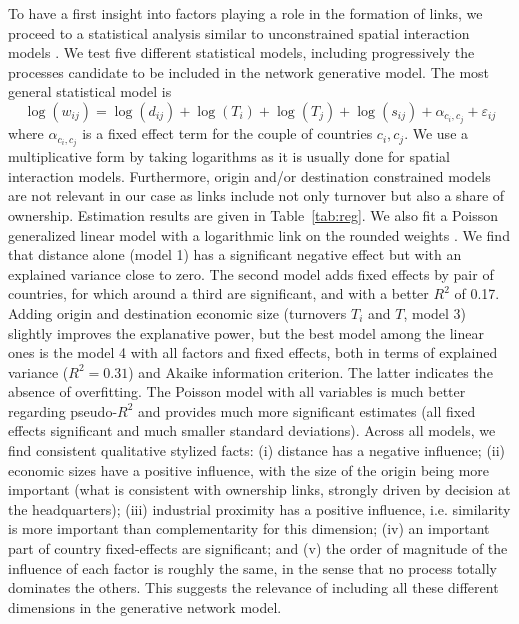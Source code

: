 \documentclass[11pt]{article}
\begin{document}
To have a first insight into factors playing a role in the formation of links, we proceed to a statistical analysis similar to unconstrained spatial interaction models \cite{wilson1975some}. We test five different statistical models, including progressively the processes candidate to be included in the network generative model. The most general statistical model is
\[
\log(w_{ij}) = \log(d_{ij}) + \log(T_i) + \log(T_j) + \log(s_{ij}) + \alpha_{c_i,c_j} + \varepsilon_{ij}
\]
where $\alpha_{c_i,c_j}$ is a fixed effect term for the couple of countries $c_i,c_j$. We use a multiplicative form by taking logarithms as it is usually done for spatial interaction models. Furthermore, origin and/or destination constrained models are not relevant in our case as links include not only turnover but also a share of ownership. Estimation results are given in Table~\ref{tab:reg}. We also fit a Poisson generalized linear model with a logarithmic link on the rounded weights \cite{flowerdew1988fitting}. We find that distance alone (model 1) has a significant negative effect but with an explained variance close to zero. The second model adds fixed effects by pair of countries, for which around a third are significant, and with a better $R^2$ of 0.17. Adding origin and destination economic size (turnovers $T_i$ and $T$, model 3) slightly improves the explanative power, but the best model among the linear ones is the model 4 with all factors and fixed effects, both in terms of explained variance ($R^2 = 0.31$) and Akaike information criterion. The latter indicates the absence of overfitting. The Poisson model with all variables is much better regarding pseudo-$R^2$ and provides much more significant estimates (all fixed effects significant and much smaller standard deviations). Across all models, we find consistent qualitative stylized facts: (i) distance has a negative influence; (ii) economic sizes have a positive influence, with the size of the origin being more important (what is consistent with ownership links, strongly driven by decision at the headquarters); (iii) industrial proximity has a positive influence, i.e. similarity is more important than complementarity for this dimension; (iv) an important part of country fixed-effects are significant; and (v) the order of magnitude of the influence of each factor is roughly the same, in the sense that no process totally dominates the others. This suggests the relevance of including all these different dimensions in the generative network model.
\end{document}
